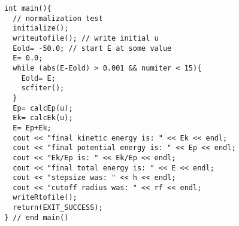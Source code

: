\documentclass[11pt,letterpaper]{article}
\begin{document}
\begin{verbatim}
int main(){
  // normalization test
  initialize();
  writeutofile(); // write initial u
  Eold= -50.0; // start E at some value
  E= 0.0;
  while (abs(E-Eold) > 0.001 && numiter < 15){
    Eold= E;
    scfiter();
  }
  Ep= calcEp(u);
  Ek= calcEk(u);
  E= Ep+Ek;
  cout << "final kinetic energy is: " << Ek << endl;
  cout << "final potential energy is: " << Ep << endl;
  cout << "Ek/Ep is: " << Ek/Ep << endl;
  cout << "final total energy is: " << E << endl;
  cout << "stepsize was: " << h << endl;
  cout << "cutoff radius was: " << rf << endl;
  writeRtofile();  
  return(EXIT_SUCCESS);
} // end main()


\end{verbatim}
\end{document}
